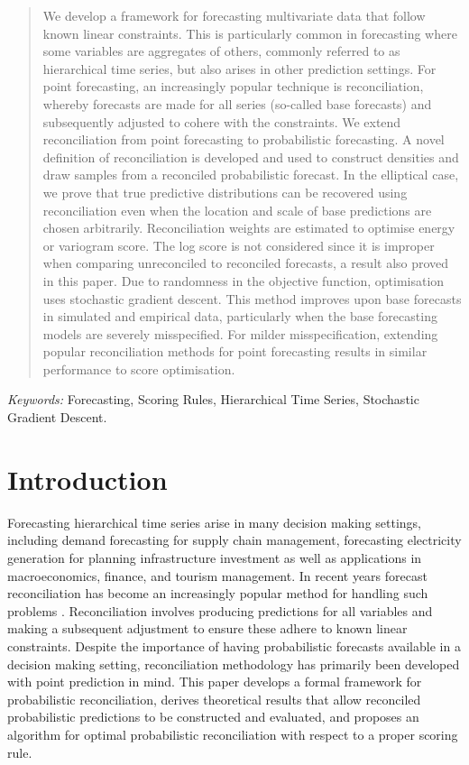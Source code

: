 \documentclass[a4paper,12pt]{article}
\theoremstyle{definition}
\begin{document}
\begin{abstract}
We develop a framework for forecasting multivariate data that follow known linear constraints. This is particularly common in forecasting where some variables are aggregates of others, commonly referred to as hierarchical time series, but also arises in other prediction settings. For point forecasting, an increasingly popular technique is reconciliation, whereby forecasts are made for all series (so-called base forecasts) and subsequently adjusted to cohere with the constraints. We extend reconciliation from point forecasting to probabilistic forecasting. A novel definition of reconciliation is developed and used to construct densities and draw samples from a reconciled probabilistic forecast. In the elliptical case, we prove that true predictive distributions can be recovered using reconciliation even when the location and scale of base predictions are chosen arbitrarily. Reconciliation weights are estimated to optimise energy or variogram score. The log score is not considered since it is improper when comparing unreconciled to reconciled forecasts, a result also proved in this paper. Due to randomness in the objective function, optimisation uses stochastic gradient descent. This method improves upon base forecasts in simulated and empirical data, particularly when the base forecasting models are severely misspecified. For milder misspecification, extending popular reconciliation methods for point forecasting results in similar performance to score optimisation.

\end{abstract}

\noindent%
{\it Keywords:}  Forecasting, Scoring Rules, Hierarchical Time Series, Stochastic Gradient Descent.

{}
\section{Introduction}\label{sec:intro}

Forecasting hierarchical time series arise in many decision making settings, including demand forecasting for supply chain management, forecasting electricity generation for planning infrastructure investment as well as applications in macroeconomics, finance, and tourism management. In recent years forecast reconciliation has become an increasingly popular method for handling such problems \citep[see][for an overview]{FPP2018}. Reconciliation involves producing predictions for all variables and making a subsequent adjustment to ensure these adhere to known linear constraints. Despite the importance of having probabilistic forecasts available in a decision making setting, reconciliation methodology has primarily been developed with point prediction in mind. This paper develops a formal framework for probabilistic reconciliation, derives theoretical results that allow reconciled probabilistic predictions to be constructed and evaluated, and proposes an algorithm for optimal probabilistic reconciliation with respect to a proper scoring rule.
\end{document}

